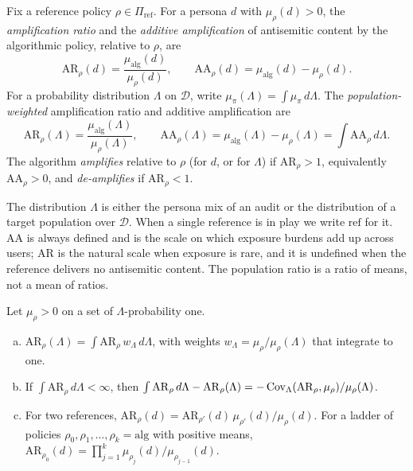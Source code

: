 \begin{definition}[Amplification]\label{def:amplification}
Fix a reference policy $\rho\in\Pi_{\mathrm{ref}}$. For a persona $d$ with $\mu_\rho(d)>0$, the \emph{amplification ratio} and the \emph{additive amplification} of antisemitic content by the algorithmic policy, relative to $\rho$, are
\[
  \mathrm{AR}_\rho(d)=\frac{\mu_{\mathrm{alg}}(d)}{\mu_\rho(d)},\qquad
  \mathrm{AA}_\rho(d)=\mu_{\mathrm{alg}}(d)-\mu_\rho(d).
\]
For a probability distribution $\Lambda$ on $\mathcal D$, write $\mu_\pi(\Lambda)=\int\mu_\pi\,d\Lambda$. The \emph{population-weighted} amplification ratio and additive amplification are
\[
  \mathrm{AR}_\rho(\Lambda)=\frac{\mu_{\mathrm{alg}}(\Lambda)}{\mu_\rho(\Lambda)},\qquad
  \mathrm{AA}_\rho(\Lambda)=\mu_{\mathrm{alg}}(\Lambda)-\mu_\rho(\Lambda)=\int\mathrm{AA}_\rho\,d\Lambda .
\]
The algorithm \emph{amplifies} relative to $\rho$ (for $d$, or for $\Lambda$) if $\mathrm{AR}_\rho>1$, equivalently $\mathrm{AA}_\rho>0$, and \emph{de-amplifies} if $\mathrm{AR}_\rho<1$.
\end{definition}

The distribution $\Lambda$ is either the persona mix of an audit or the distribution of a target population over $\mathcal D$. When a single reference is in play we write $\mathrm{ref}$ for it. $\mathrm{AA}$ is always defined and is the scale on which exposure burdens add up across users; $\mathrm{AR}$ is the natural scale when exposure is rare, and it is undefined when the reference delivers no antisemitic content. The population ratio is a ratio of means, not a mean of ratios.

\begin{lemma}\label{lem:est-agg}
Let $\mu_\rho>0$ on a set of $\Lambda$-probability one.
\begin{enumerate}[(a)]
  \item $\mathrm{AR}_\rho(\Lambda)=\int\mathrm{AR}_\rho\,w_\Lambda\,d\Lambda$, with weights $w_\Lambda=\mu_\rho/\mu_\rho(\Lambda)$ that integrate to one.
  \item If $\int\mathrm{AR}_\rho\,d\Lambda<\infty$, then $\int\mathrm{AR}_\rho\,d\Lambda-\mathrm{AR}_\rho(\Lambda)=-\operatorname{Cov}_\Lambda(\mathrm{AR}_\rho,\mu_\rho)/\mu_\rho(\Lambda)$.
  \item For two references, $\mathrm{AR}_\rho(d)=\mathrm{AR}_{\rho'}(d)\,\mu_{\rho'}(d)/\mu_\rho(d)$. For a ladder of policies $\rho_0,\rho_1,\dots,\rho_k=\mathrm{alg}$ with positive means, $\mathrm{AR}_{\rho_0}(d)=\prod_{j=1}^{k}\mu_{\rho_j}(d)/\mu_{\rho_{j-1}}(d)$.
\end{enumerate}
\end{lemma}

